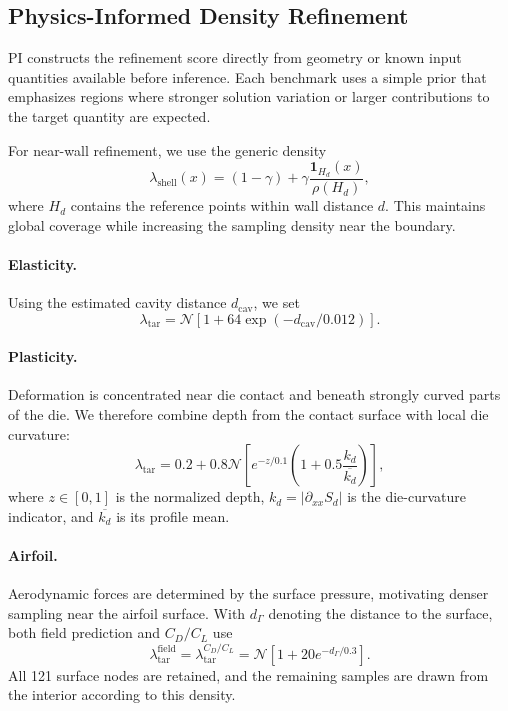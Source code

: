 \subsection{Physics-Informed Density Refinement}
\label{app:pi_density_design}

PI constructs the refinement score directly from geometry or known input
quantities available before inference. Each benchmark uses a simple prior that
emphasizes regions where stronger solution variation or larger contributions to
the target quantity are expected.

For near-wall refinement, we use the generic density
\begin{equation}
    \lambda_{\mathrm{shell}}(x)
    =(1-\gamma)
    +\gamma\frac{\mathbf{1}_{H_d}(x)}{\rho(H_d)},
    \label{eq:app_density_shell}
\end{equation}
where $H_d$ contains the reference points within wall distance $d$. This
maintains global coverage while increasing the sampling density near the
boundary.

\paragraph{Elasticity.}
Using the estimated cavity distance $d_{\mathrm{cav}}$, we set
\begin{equation}
    \lambda_{\mathrm{tar}}
    =\mathcal{N}\!\left[
        1+64\exp(-d_{\mathrm{cav}}/0.012)
    \right].
    \label{eq:app_pi_elasticity_density}
\end{equation}

\paragraph{Plasticity.}
Deformation is concentrated near die contact and beneath strongly curved parts
of the die. We therefore combine depth from the contact surface with local die
curvature:
\begin{equation}
    \lambda_{\mathrm{tar}}
    =0.2+0.8\mathcal{N}\!\left[
        e^{-z/0.1}
        \left(1+0.5\frac{k_d}{\overline{k_d}}\right)
    \right],
    \label{eq:app_pi_plasticity_density}
\end{equation}
where $z\in[0,1]$ is the normalized depth,
$k_d=|\partial_{xx}S_d|$ is the die-curvature indicator, and
$\overline{k_d}$ is its profile mean.

\paragraph{Airfoil.}
Aerodynamic forces are determined by the surface pressure, motivating denser
sampling near the airfoil surface. With $d_\Gamma$ denoting the distance to the
surface, both field prediction and $C_D/C_L$ use
\begin{equation}
    \lambda_{\mathrm{tar}}^{\mathrm{field}}
    =\lambda_{\mathrm{tar}}^{C_D/C_L}
    =\mathcal{N}\!\left[
        1+20e^{-d_\Gamma/0.3}
    \right].
    \label{eq:app_pi_airfoil_density}
\end{equation}
All 121 surface nodes are retained, and the remaining samples are drawn from
the interior according to this density.

